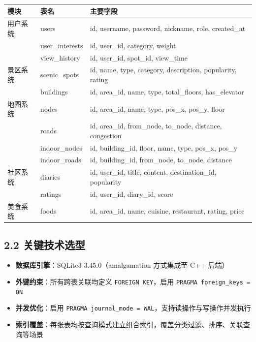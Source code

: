 \documentclass[12pt,a4paper]{article}
\begin{document}
\begin{center}
\begin{tabular}{l l l}
    \toprule
    \bfseries 模块 & \bfseries 表名 & \bfseries 主要字段 \\
    \midrule
    用户系统 & users & id, username, password, nickname, role, created\_at \\
    & user\_interests & id, user\_id, category, weight \\
    & view\_history & id, user\_id, spot\_id, view\_time \\

    景区系统 & scenic\_spots & id, name, type, category, description, popularity, rating \\
    & buildings & id, area\_id, name, type, total\_floors, has\_elevator \\

    地图系统 & nodes & id, area\_id, name, type, pos\_x, pos\_y, floor \\
    & roads & id, area\_id, from\_node, to\_node, distance, congestion \\
    & indoor\_nodes & id, building\_id, floor, name, type, pos\_x, pos\_y \\
    & indoor\_roads & id, building\_id, from\_node, to\_node, distance \\

    社区系统 & diaries & id, user\_id, title, content, destination\_id, popularity \\
    & ratings & id, user\_id, diary\_id, score \\

    美食系统 & foods & id, area\_id, name, cuisine, restaurant, rating, price \\
    \bottomrule
\end{tabular}
\end{center}

\subsection*{2.2 关键技术选型}

\begin{itemize}[leftmargin=2em]
    \item \textbf{数据库引擎}：SQLite3 3.45.0（amalgamation 方式集成至 C++ 后端）
    \item \textbf{外键约束}：所有跨表关联均定义 \texttt{FOREIGN KEY}，启用 \texttt{PRAGMA foreign\_keys = ON}
    \item \textbf{并发优化}：启用 \texttt{PRAGMA journal\_mode = WAL}，支持读操作与写操作并发执行
    \item \textbf{索引覆盖}：每张表均按查询模式建立组合索引，覆盖分类过滤、排序、关联查询等场景
\end{itemize}
\end{document}
